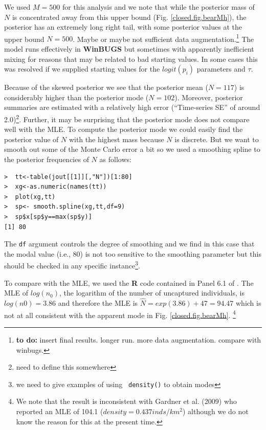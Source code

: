 We used $M=500$ for this analysis and we
note that  while the posterior mass of $N$ is concentrated away from this
upper bound (Fig. \ref{closed.fig.bearMh}), the posterior has an
extremely long right tail, with some posterior values at the upper
bound $N=500$. Maybe or
maybe not sufficient data augmentation.\footnote{
{\bf to do: } insert final results. longer run. more data
augmentation. compare with winbugs.
}
The model runs effectively in {\bf WinBUGS} but sometimes with apparently
inefficient mixing for reasons that may be related to bad starting
values. In some cases this was resolved if we supplied starting values
for the $logit(p_{i})$ parameters and $\tau$.


Because of the skewed posterior we see that the posterior mean ($N=117$)
is
considerably higher than the posterior mode ($N=102$). Moreover, 
posterior summaries are estimated with a relatively high error
(``Time-series SE'' of around 2.0)\footnote{need to define this somewhere}.
Further, it may be surprising that the posterior mode does not compare
well with the MLE. To compute the posterior mode we could easily find
the posterior value of $N$ with the highest mass because $N$ is
discrete. But we want to smooth out some of the Monte Carlo error a
bit so we used a smoothing spline to the posterior frequencies of $N$
as follows:
\begin{verbatim}
>  tt<-table(jout[[1]][,"N"])[1:80]
>  xg<-as.numeric(names(tt))
>  plot(xg,tt)
>  sp<- smooth.spline(xg,tt,df=9)
>  sp$x[sp$y==max(sp$y)]
[1] 80
\end{verbatim}
The \mbox{\tt df} argument controls the degree of smoothing and we
find in this case that the modal value (i.e., 80) is not too sensitive
to the smoothing parameter but this should be checked in any specific
instance\footnote{we need to give examples of using \mbox{\tt
    density()} to obtain modes}.

To compare with the MLE, we used 
the {\bf R} code contained in Panel 6.1 of \citet{royle_dorazio:2008}.  The
MLE of $log(n_{0})$, the logarithm of the number of uncaptured
individuals, is $log(n0) = 3.86$ and therefore the MLE is $\hat{N} =
exp(3.86)+47 = 94.47$ which is not at all consistent with the apparent
mode in 
Fig. \ref{closed.fig.bearMh}.
\footnote{We note that the result is inconsistent with Gardner et
  al. (2009) who reported an MLE of 104.1 ($density = 0.437
  inds/km^2$) although we do not know the reason for this at the
  present time.}  


